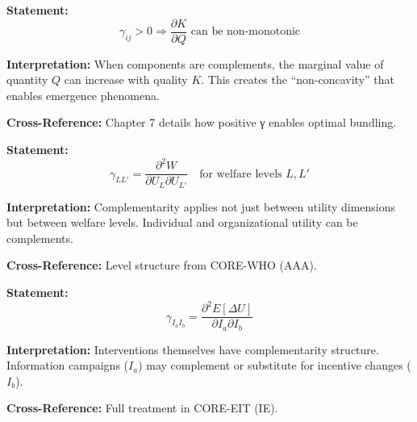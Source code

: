 \begin{tcolorbox}[colback=gray!5!white, colframe=gray!75!black,
    title=Axiom UNMAPPED_CMP-8: Emergence from Complementarity]
\textbf{Statement:}
\begin{equation}
\gamma_{ij} > 0 \Rightarrow \frac{\partial K}{\partial Q} \text{ can be non-monotonic}
\end{equation}

\textbf{Interpretation:} When components are complements, the marginal value of
quantity $Q$ can increase with quality $K$. This creates the ``non-concavity''
that enables emergence phenomena.

\textbf{Cross-Reference:} Chapter 7 details how positive γ enables optimal bundling.
\end{tcolorbox}

\begin{tcolorbox}[colback=gray!5!white, colframe=gray!75!black,
    title=Axiom UNMAPPED_CMP-9: Level-Level Complementarity]
\textbf{Statement:}
\begin{equation}
\gamma_{LL'} = \frac{\partial^2 W}{\partial U_L \partial U_{L'}} \quad \text{for welfare levels } L, L'
\end{equation}

\textbf{Interpretation:} Complementarity applies not just between utility dimensions
but between welfare levels. Individual and organizational utility can be complements.

\textbf{Cross-Reference:} Level structure from CORE-WHO (AAA).
\end{tcolorbox}

\begin{tcolorbox}[colback=gray!5!white, colframe=gray!75!black,
    title=Axiom UNMAPPED_CMP-10: Intervention Complementarity]
\textbf{Statement:}
\begin{equation}
\gamma_{I_a I_b} = \frac{\partial^2 E[\Delta U]}{\partial I_a \partial I_b}
\end{equation}

\textbf{Interpretation:} Interventions themselves have complementarity structure.
Information campaigns ($I_a$) may complement or substitute for incentive changes ($I_b$).

\textbf{Cross-Reference:} Full treatment in CORE-EIT (IE).
\end{tcolorbox}

